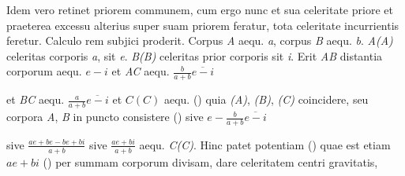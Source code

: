 %
Idem vero retinet priorem communem,
cum ergo nunc et sua celeritate priore
et praeterea excessu alterius super suam priorem feratur,
tota celeritate incurrientis feretur.%
\protect{}%
\pend%
%
%
%
%
\pstart%
Calculo rem subjici proderit.%
\protect{}
Corpus \textit{A} aequ. \textit{a},
corpus \textit{B} aequ. \textit{b}.
\textit{A(A)} celeritas
%
%
corporis \textit{a}, sit \textit{e}.
\textit{B(B)} celeritas prior corporis
%
%
sit \textit{i}.
Erit \textit{AB} distantia corporum%
\protect{}
aequ. $e - i$
et \textit{AC} aequ. $\displaystyle\frac{b}{a+b}\overline{e-i}$
\rule[-4mm]{0mm}{10mm}%
et \textit{BC} aequ. $\displaystyle\frac{a}{a+b}\overline{e-i}$
et $C(C)$ aequ.
%
%
(\protect\vphantom)%
%
quia
%
%
\textit{(A)}, \textit{(B)}, \textit{(C)} coincidere,
seu corpora \textit{A}, \textit{B} in puncto consistere%
%
\protect\vphantom()
sive $e-\displaystyle\frac{b}{a+b}\overline{e-i}$%
\rule[-4mm]{0mm}{10mm}
sive $\displaystyle\frac{ae + be-be + bi}{a+b}$ sive $\displaystyle\frac{ae + bi}{a+b}$ aequ. \textit{C(C)}.%
%
%
%
%
\pend%
%
\pstart%
Hinc patet potentiam%
\protect{}
(\protect\vphantom)%
quae est etiam $ae + bi$%
\protect\vphantom()
per summam corporum divisam,%
\protect{}
dare celeritatem centri gravitatis,%
